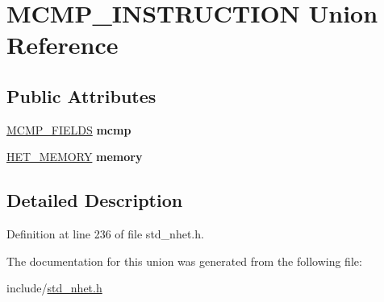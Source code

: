 \hypertarget{unionMCMP__INSTRUCTION}{}\section{M\+C\+M\+P\+\_\+\+I\+N\+S\+T\+R\+U\+C\+T\+I\+ON Union Reference}
\label{unionMCMP__INSTRUCTION}
\subsection*{Public Attributes}
\begin{DoxyCompactItemize}
\item 
\mbox{\label{unionMCMP__INSTRUCTION_ac6c2a2344013a3db697ad51db88840f3}} 
\mbox{\hyperlink{structmcmp__format}{M\+C\+M\+P\+\_\+\+F\+I\+E\+L\+DS}} {\bfseries mcmp}
\item 
\mbox{\label{unionMCMP__INSTRUCTION_a23401bb1fe9d895b84914d2cba0ab81c}} 
\mbox{\hyperlink{structmemory__format}{H\+E\+T\+\_\+\+M\+E\+M\+O\+RY}} {\bfseries memory}
\end{DoxyCompactItemize}


\subsection{Detailed Description}


Definition at line 236 of file std\+\_\+nhet.\+h.



The documentation for this union was generated from the following file\+:\begin{DoxyCompactItemize}
\item 
include/\mbox{\hyperlink{std__nhet_8h}{std\+\_\+nhet.\+h}}\end{DoxyCompactItemize}
